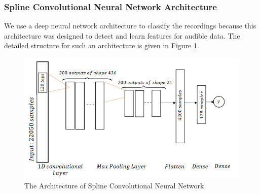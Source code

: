 \subsubsection{Spline Convolutional Neural Network Architecture}
We use a deep neural network architecture \cite{balestriero2018spline} to classify the recordings because this architecture was designed to detect and learn features for audible data. The detailed structure for such an architecture is given in Figure \ref{fig:spline_cnn}.
\begin{figure}[htbp]
  \centering
  \includegraphics[width=\textwidth]{./Figures/spline_cnn.png}
  \caption{The Architecture of Spline Convolutional Neural Network}
  \label{fig:spline_cnn}
\end{figure}

